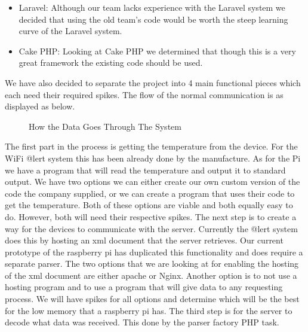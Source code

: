 \documentclass{report}
\begin{document}
\begin{itemize}
\item Laravel: Although our team lacks experience with the Laravel system we decided that using the old team's code would be worth the steep learning curve of the Laravel system.
\item Cake PHP: Looking at Cake PHP we determined that though this is a very great framework the existing code should be used.
\end{itemize}
We have also decided to separate the project into 4 main functional pieces which each need their required spikes. The flow of the normal communication is as displayed as below.
\begin{figure}[H]
\caption{How the Data Goes Through The System}
\end{figure}
The first part in the process is getting the temperature from the device. 
For the WiFi @lert system this has been already done by the manufacture. 
As for the Pi we have a program that will read the temperature and output it to standard output.
We have two options we can either create our own custom version of the code the company supplied, or we can create a program that uses their code to get the temperature.
Both of these options are viable and both equally easy to do. 
However, both will need their respective spikes.
\newline
\indent
The next step is to create a way for the devices to communicate with the server.
Currently the @lert system does this by hosting an xml document that the server retrieves.
Our current prototype of the raspberry pi has duplicated this functionality and does require a separate parser.
The two options that we are looking at for enabling the hosting of the xml document are either apache or Nginx.
Another option is to not use a hosting program and to use a program that will give data to any requesting process.
We will have spikes for all options and determine which will be the best for the low memory that a raspberry pi has.
\newline
\indent
The third step is for the server to decode what data was received. 
This done by the parser factory PHP task.
\end{document}
